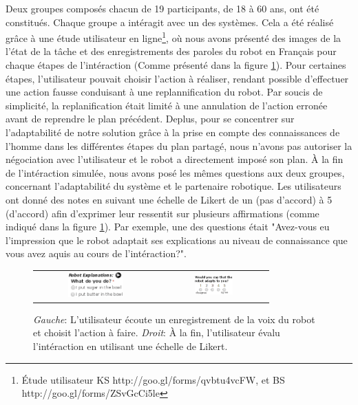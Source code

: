 \documentclass[a4paper,11pt,twoside]{StyleThese}
\begin{document}
Deux groupes composés chacun de 19 participants, de 18 à 60 ans, ont été constitués. Chaque groupe a intéragit avec un des systèmes. Cela a été réalisé grâce à une étude utilisateur en ligne\footnote{Étude utilisateur KS http://goo.gl/forms/qvbtu4vcFW, et BS http://goo.gl/forms/ZSvGcCi5le}, où nous avons présenté des images de la l'état de la tâche et des enregistrements des paroles du robot en Français pour chaque étapes de l'intéraction (Comme présenté dans la figure \ref{fig:user_study}).
Pour certaines étapes, l'utilisateur pouvait choisir l'action à réaliser, rendant possible d'effectuer une action fausse conduisant à une replannification du robot. Par soucis de simplicité, la replanification était limité à une annulation de l'action erronée avant de reprendre le plan précédent. Deplus, pour se concentrer sur l'adaptabilité de notre solution grâce à la prise en compte des connaissances de l'homme dans les différentes étapes du plan partagé, nous n'avons pas autoriser la négociation avec l'utilisateur et le robot a directement imposé son plan.
À la fin de l'intéraction simulée, nous avons posé les mêmes questions aux deux groupes, concernant l'adaptabilité du système et le partenaire robotique.
Les utilisateurs ont donné des notes en suivant une échelle de Likert de un (pas d'accord) à 5 (d'accord) afin d'exprimer leur ressentit sur plusieurs affirmations (comme indiqué dans la figure \ref{fig:user_study}).
Par exemple, une des questions était "Avez-vous eu l'impression que le robot adaptait ses explications au niveau de connaissance que vous avez aquis au cours de l'intéraction?".

\begin{figure}[ht!]
 \centering
 \begin{tabular}{cc}
  \includegraphics[width=0.48\textwidth]{img/ustudy9.png} &
  \includegraphics[width=0.38\textwidth]{img/ustudy11.png}
 \end{tabular}
 \caption{\textit{Gauche}: L'utilisateur écoute un enregistrement de la voix du robot et choisit l'action à faire. \textit{Droit}: À la fin, l'utilisateur évalu l'intéraction en utilisant une échelle de Likert.}
 \label{fig:user_study}
 \end{figure}
\end{document}
